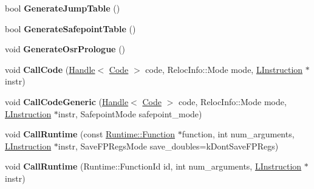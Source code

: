 \begin{DoxyCompactItemize}
\item 
bool {\bfseries Generate\+Jump\+Table} ()\hypertarget{classv8_1_1internal_1_1_l_code_gen_af066f353885f2f3cec35f74445989328}{}\label{classv8_1_1internal_1_1_l_code_gen_af066f353885f2f3cec35f74445989328}

\item 
bool {\bfseries Generate\+Safepoint\+Table} ()\hypertarget{classv8_1_1internal_1_1_l_code_gen_aa8cc24b1134b87ea8ce0a9a5c5688b5a}{}\label{classv8_1_1internal_1_1_l_code_gen_aa8cc24b1134b87ea8ce0a9a5c5688b5a}

\item 
void {\bfseries Generate\+Osr\+Prologue} ()\hypertarget{classv8_1_1internal_1_1_l_code_gen_a911d24be4ac4e392d736d9769b7ebb8f}{}\label{classv8_1_1internal_1_1_l_code_gen_a911d24be4ac4e392d736d9769b7ebb8f}

\item 
void {\bfseries Call\+Code} (\hyperlink{classv8_1_1internal_1_1_handle}{Handle}$<$ \hyperlink{classv8_1_1internal_1_1_code}{Code} $>$ code, Reloc\+Info\+::\+Mode mode, \hyperlink{classv8_1_1internal_1_1_l_instruction}{L\+Instruction} $\ast$instr)\hypertarget{classv8_1_1internal_1_1_l_code_gen_aca293066a99024759f94b995c6ba5ce5}{}\label{classv8_1_1internal_1_1_l_code_gen_aca293066a99024759f94b995c6ba5ce5}

\item 
void {\bfseries Call\+Code\+Generic} (\hyperlink{classv8_1_1internal_1_1_handle}{Handle}$<$ \hyperlink{classv8_1_1internal_1_1_code}{Code} $>$ code, Reloc\+Info\+::\+Mode mode, \hyperlink{classv8_1_1internal_1_1_l_instruction}{L\+Instruction} $\ast$instr, Safepoint\+Mode safepoint\+\_\+mode)\hypertarget{classv8_1_1internal_1_1_l_code_gen_a902e149712841134b7a31a866542b477}{}\label{classv8_1_1internal_1_1_l_code_gen_a902e149712841134b7a31a866542b477}

\item 
void {\bfseries Call\+Runtime} (const \hyperlink{structv8_1_1internal_1_1_runtime_1_1_function}{Runtime\+::\+Function} $\ast$function, int num\+\_\+arguments, \hyperlink{classv8_1_1internal_1_1_l_instruction}{L\+Instruction} $\ast$instr, Save\+F\+P\+Regs\+Mode save\+\_\+doubles=k\+Dont\+Save\+F\+P\+Regs)\hypertarget{classv8_1_1internal_1_1_l_code_gen_ac9553032ed88d8b7b9a408c04124781f}{}\label{classv8_1_1internal_1_1_l_code_gen_ac9553032ed88d8b7b9a408c04124781f}

\item 
void {\bfseries Call\+Runtime} (Runtime\+::\+Function\+Id id, int num\+\_\+arguments, \hyperlink{classv8_1_1internal_1_1_l_instruction}{L\+Instruction} $\ast$instr)\hypertarget{classv8_1_1internal_1_1_l_code_gen_ac16bd03d079fe227358121f48075b4b7}{}\label{classv8_1_1internal_1_1_l_code_gen_ac16bd03d079fe227358121f48075b4b7}


\end{DoxyCompactItemize}
